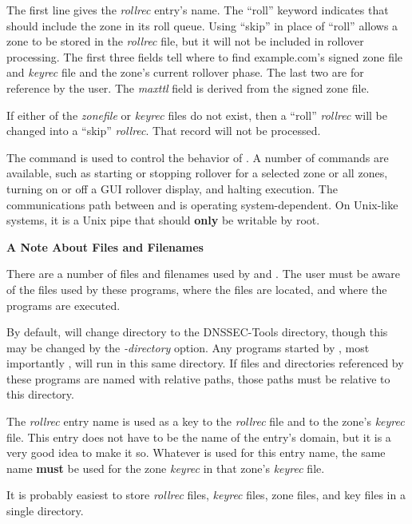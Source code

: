 The first line gives the {\it rollrec} entry's name.  The ``roll'' keyword
indicates that  should include the zone in its roll queue.  Using
``skip'' in place of ``roll'' allows a zone to be stored in the {\it rollrec}
file, but it will not be included in rollover processing.  The first three
fields tell  where to find example.com's signed zone file and
{\it keyrec} file and the zone's current rollover phase.  The last two are
for reference by the user.  The {\it maxttl} field is derived from the signed
zone file.

If either of the {\it zonefile} or {\it keyrec} files do not exist, then a
``roll'' {\it rollrec} will be changed into a ``skip'' {\it rollrec}.  That
record will not be processed.

The  command is used to control the behavior of .
A number of commands are available, such as starting or stopping rollover for
a selected zone or all zones, turning on or off a GUI rollover display, and
halting  execution.  The communications path between
 and  is operating system-dependent.  On Unix-like
systems, it is a Unix pipe that should {\bf only} be writable by root.

{\bf A Note About Files and Filenames}

There are a number of files and filenames used by  and
.  The user must be aware of the files used by these programs,
where the files are located, and where the programs are executed.

By default,  will change directory to the DNSSEC-Tools directory,
though this may be changed by the {\it -directory} option.  Any programs
started by , most importantly , will run in this
same directory.  If files and directories referenced by these programs are
named with relative paths, those paths must be relative to this directory.

The {\it rollrec} entry name is used as a key to the {\it rollrec} file and to
the zone's {\it keyrec} file.  This entry does not have to be the name of the
entry's domain, but it is a very good idea to make it so.  Whatever is used
for this entry name, the same name {\bf must} be used for the zone
{\it keyrec} in that zone's {\it keyrec} file.

It is probably easiest to store {\it rollrec} files, {\it keyrec} files, zone
files, and key files in a single directory.

